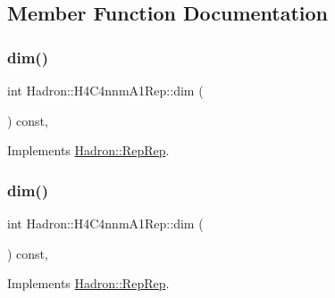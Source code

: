 \subsection{Member Function Documentation}
\mbox{\label{structHadron_1_1H4C4nnmA1Rep_a4712bc0c0495973cbd377882020b130f}} 
\subsubsection{\texorpdfstring{dim()}{dim()}\hspace{0.1cm}{\footnotesize\ttfamily [1/5]}}
{\footnotesize\ttfamily int Hadron\+::\+H4\+C4nnm\+A1\+Rep\+::dim (\begin{DoxyParamCaption}{ }\end{DoxyParamCaption}) const\hspace{0.3cm}{\ttfamily [inline]}, {\ttfamily [virtual]}}



Implements \mbox{\hyperlink{structHadron_1_1RepRep_a92c8802e5ed7afd7da43ccfd5b7cd92b}{Hadron\+::\+Rep\+Rep}}.

\mbox{\label{structHadron_1_1H4C4nnmA1Rep_a4712bc0c0495973cbd377882020b130f}} 
\subsubsection{\texorpdfstring{dim()}{dim()}\hspace{0.1cm}{\footnotesize\ttfamily [2/5]}}
{\footnotesize\ttfamily int Hadron\+::\+H4\+C4nnm\+A1\+Rep\+::dim (\begin{DoxyParamCaption}{ }\end{DoxyParamCaption}) const\hspace{0.3cm}{\ttfamily [inline]}, {\ttfamily [virtual]}}



Implements \mbox{\hyperlink{structHadron_1_1RepRep_a92c8802e5ed7afd7da43ccfd5b7cd92b}{Hadron\+::\+Rep\+Rep}}.

\mbox{\label{structHadron_1_1H4C4nnmA1Rep_a4712bc0c0495973cbd377882020b130f}} 
